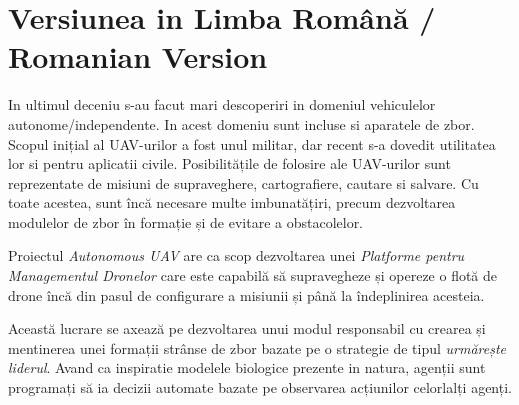 
\section{Versiunea in Limba Română / Romanian Version}

In ultimul deceniu s-au facut mari descoperiri in domeniul vehiculelor autonome/independente.
In acest domeniu sunt incluse si aparatele de zbor. Scopul inițial al UAV-urilor a fost unul
militar, dar recent s-a dovedit utilitatea lor si pentru aplicatii civile. Posibilitățile de 
folosire ale UAV-urilor sunt reprezentate de misiuni de 
supraveghere, cartografiere,  cautare si salvare. Cu toate acestea, 
sunt încă necesare multe imbunatățiri, precum dezvoltarea modulelor de 
zbor în formație și de evitare a obstacolelor.

Proiectul  \textit{Autonomous UAV} are ca scop dezvoltarea unei
\textit{Platforme pentru Managementul Dronelor} care este capabilă să supravegheze
și opereze o flotă de drone încă din pasul de configurare a misiunii și până la
îndeplinirea acesteia.

Această lucrare se axează pe dezvoltarea unui modul responsabil cu crearea și mentinerea
unei formații strânse de zbor bazate pe o strategie de tipul \textit{urmărește
liderul}. Avand ca inspiratie modelele biologice prezente in natura, agenții sunt programați să ia
decizii automate bazate pe observarea acțiunilor celorlalți agenți.



